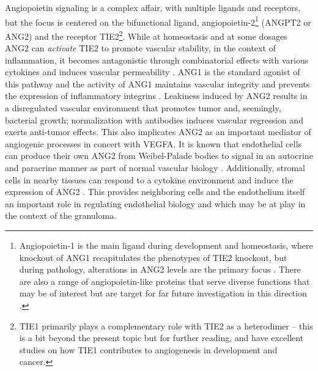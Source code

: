 Angiopoietin signaling is a complex affair, with multiple ligands and receptors, but the focus is centered on the bifunctional ligand, angiopoietin\hyp{}2\footnote{Angiopoietin\hyp{}1 is the main ligand during development and homeostasis, where knockout of ANG1 recapitulates the phenotypes of TIE2 knockout, but during pathology, alterations in ANG2 levels are the primary focus \citep{Akwii2021}. There are also a range of angiopoietin\hyp{}like proteins that serve diverse functions that may be of interest but are target for far future investigation in this direction \citep{Hato2008}.} (ANGPT2 or ANG2) and the receptor TIE2\footnote{TIE1 primarily plays a complementary role with TIE2 as a heterodimer -- this is a bit beyond the present topic but for further reading, \citet{Savant2015} and \citet{LaPorta2018} have excellent studies on how TIE1 contributes to angiogenesis in development and cancer.}. While at homeostasis and at some dosages ANG2 can \textit{activate} TIE2 to promote vascular stability, in the context of inflammation, it becomes antagonistic through combinatorial effects with various cytokines and induces vascular permeability \citep{Augustin2009}. ANG1 is the standard agonist of this pathway and the activity of ANG1 maintains vascular integrity and prevents the expression of inflammatory integrins \citep{Augustin2009}. Leakiness induced by ANG2 results in a disregulated vascular environment that promotes tumor and, seemingly, bacterial growth; normalization with antibodies induces vascular regression and exerts anti\hyp{}tumor effects. This also implicates ANG2 as an important mediator of angiogenic processes in concert with VEGFA. It is known that endothelial cells can produce their own ANG2 from Weibel\hyp{}Palade bodies to signal in an autocrine and paracrine manner as part of normal vascular biology \citep{Fiedler2004}. Additionally, stromal cells in nearby tissues can respond to a cytokine environment and induce the expression of ANG2 \citep{Hato2008, Huang2010, Thurston2012}. This provides neighboring cells and the endothelium itself an important role in regulating endothelial biology and which may be at play in the context of the granuloma.

